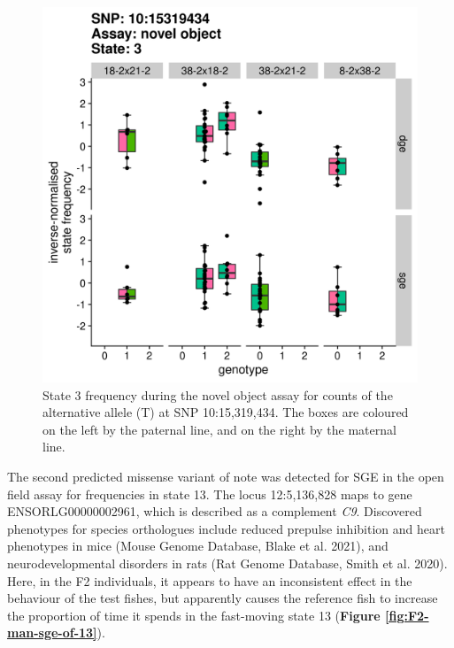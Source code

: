 \documentclass[
]{book}
\begin{document}
\begin{figure}
\includegraphics[width=1\linewidth]{figs/mikk_behaviour/sig_snps_boxplots/3-10:15319434} \caption{State 3 frequency during the novel object assay for counts of the alternative allele (T) at SNP 10:15,319,434. The boxes are coloured on the left by the paternal line, and on the right by the maternal line.}\label{fig:sig-snp-10-15mb}
\end{figure}

The second predicted missense variant of note was detected for SGE in the open field assay for frequencies in state 13. The locus 12:5,136,828 maps to gene ENSORLG00000002961, which is described as a complement \emph{C9}. Discovered phenotypes for species orthologues include reduced prepulse inhibition and heart phenotypes in mice (Mouse Genome Database, Blake et al. 2021), and neurodevelopmental disorders in rats (Rat Genome Database, Smith et al. 2020). Here, in the F2 individuals, it appears to have an inconsistent effect in the behaviour of the test fishes, but apparently causes the reference fish to increase the proportion of time it spends in the fast-moving state 13 (\textbf{Figure \ref{fig:F2-man-sge-of-13}}).
\end{document}
